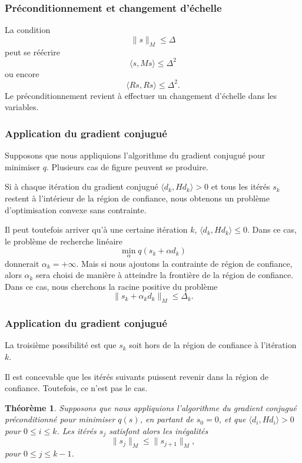 \documentclass[usepdftitle=false,aspectratio=169]{beamer}
\newtheorem{thm}{Théorème}
\begin{document}
\begin{frame}
\frametitle{Préconditionnement et changement d'échelle}

La condition
$$
\| s \|_M \leq \Delta
$$
peut se réécrire
$$
\langle s, Ms \rangle \leq \Delta^2
$$
ou encore
$$
\langle Rs, Rs \rangle \leq \Delta^2.
$$
Le préconditionnement revient à effectuer un changement d'échelle dans les variables.

\end{frame}

\begin{frame}
\frametitle{Application du gradient conjugué}

Supposons que nous appliquions l'algorithme du gradient conjugué pour minimiser $q$.
Plusieurs cas de figure peuvent se produire.

\mbox{}

Si à chaque itération du gradient conjugué $\langle d_k, Hd_k \rangle > 0$ et tous les itérés $s_k$ restent à l'intérieur de la région de confiance, nous obtenons un problème d'optimisation convexe sans contrainte.

\mbox{}

Il peut toutefois arriver qu'à une certaine itération $k$, $\langle d_k, Hd_k \rangle \leq 0$. Dans ce cas, le problème de recherche linéaire
$$
\min_{\alpha} q(s_k+\alpha d_k)
$$
donnerait $\alpha_k = +\infty$. Mais si nous ajoutons la contrainte de région de confiance, alors $\alpha_k$ sera choisi de manière à atteindre la frontière de la région de confiance.
Dans ce cas, nous cherchons la racine positive du problème
$$
\| s_k + \alpha_k d_k \|_M \leq \Delta_k.
$$

\end{frame}

\begin{frame}
\frametitle{Application du gradient conjugué}

La troisième possibilité est que $s_k$ soit hors de la région de confiance à l'itération $k$.

\mbox{}

Il est concevable que les itérés suivants puissent revenir dans la région de confiance.
Toutefois, ce n'est pas le cas.

\begin{thm}
Supposons que nous appliquions l'algorithme du gradient conjugué préconditionné pour minimiser $q(s)$, en partant de $s_0 = 0$, et que $\langle d_i, Hd_i \rangle > 0$ pour $0 \leq i \leq k$.
Les itérés $s_j$ satisfont alors les inégalités
$$
\| s_j \|_M \leq \| s_{j+1} \|_M,
$$
pour $0 \leq j \leq k-1$.
\end{thm}

\end{frame}
\end{document}
